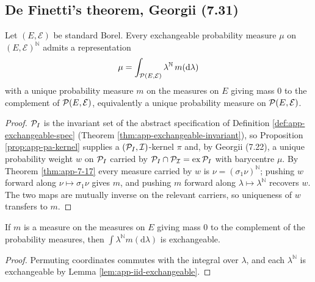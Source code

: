 \subsection*{De Finetti's theorem, Georgii (7.31)}

\begin{theorem}
    \label{thm:app-de-finetti}
    \leanok

    Let $(E, \mathcal{E})$ be standard Borel.  Every exchangeable probability measure $\mu$ on
    $(E, \mathcal{E})^{\mathbb{N}}$ admits a representation
    \[\mu = \int_{\mathcal{P}(E, \mathcal{E})} \lambda^{\mathbb{N}}\, m(\mathrm{d}\lambda)\]
    with a unique probability measure $m$ on the measures on $E$ giving mass $0$ to the
    complement of $\mathcal{P}(E, \mathcal{E})$, equivalently a unique probability measure on
    $\mathcal{P}(E, \mathcal{E})$.
\end{theorem}
\begin{proof}
    \leanok

    $\mathcal{P}_I$ is the invariant set of the abstract specification of Definition
    \ref{def:app-exchangeable-spec} (Theorem \ref{thm:app-exchangeable-invariant}), so
    Proposition \ref{prop:app-pa-kernel} supplies a $(\mathcal{P}_I, \mathcal{I})$-kernel $\pi$ and,
    by Georgii (7.22), a unique probability weight $w$ on $\mathcal{P}_I$ carried by
    $\mathcal{P}_I \cap \mathcal{P}_{\mathcal{I}} = \mathrm{ex}\,\mathcal{P}_I$ with barycentre $\mu$.  By
    Theorem \ref{thm:app-7-17} every measure carried by $w$ is $\nu = (\sigma_1\nu)^{\mathbb{N}}$;
    pushing $w$ forward along $\nu \mapsto \sigma_1\nu$ gives $m$, and pushing $m$ forward
    along $\lambda \mapsto \lambda^{\mathbb{N}}$ recovers $w$.  The two maps are mutually
    inverse on the relevant carriers, so uniqueness of $w$ transfers to $m$.
\end{proof}

\begin{lemma}
    \label{lem:app-mixture-exchangeable}
    \leanok

    If $m$ is a measure on the measures on $E$ giving mass $0$ to the complement of the
    probability measures, then $\int \lambda^{\mathbb{N}} m(\mathrm{d}\lambda)$ is
    exchangeable.
\end{lemma}
\begin{proof}
    \leanok

    Permuting coordinates commutes with the integral over $\lambda$, and each
    $\lambda^{\mathbb{N}}$ is exchangeable by Lemma \ref{lem:app-iid-exchangeable}.
\end{proof}


